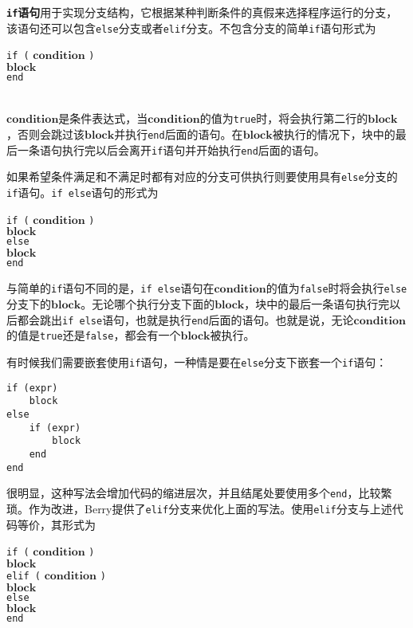 \textbf{\texttt{if}语句}用于实现分支结构，它根据某种判断条件的真假来选择程序运行的分支，该语句还可以包含\texttt{else}分支或者\texttt{elif}分支。不包含分支的简单\texttt{if}语句形式为
\begin{algorithm}
    \texttt{if (} $\bm{condition}$ \texttt{)} \\
    \qquad $\bm{block}$ \\
    \texttt{end}
\end{algorithm}\vspace{-0.6em}\\
$\bm{condition}$是条件表达式，当$\bm{condition}$的值为\texttt{true}时，将会执行第二行的$\bm{block}$，否则会跳过该$\bm{block}$并执行\texttt{end}后面的语句。在$\bm{block}$被执行的情况下，块中的最后一条语句执行完以后会离开\texttt{if}语句并开始执行\texttt{end}后面的语句。

如果希望条件满足和不满足时都有对应的分支可供执行则要使用具有\texttt{else}分支的\texttt{if}语句。\texttt{if else}语句的形式为
\begin{algorithm}
    \texttt{if (} $\bm{condition}$ \texttt{)} \\
        \qquad $\bm{block}$ \\
    \texttt{else} \\
        \qquad $\bm{block}$ \\
    \texttt{end}
\end{algorithm}\vspace{-0.6em}

与简单的\texttt{if}语句不同的是，\texttt{if else}语句在$\bm{condition}$的值为\texttt{false}时将会执行\texttt{else}分支下的$\bm{block}$。无论哪个执行分支下面的$\bm{block}$，块中的最后一条语句执行完以后都会跳出\texttt{if else}语句，也就是执行\texttt{end}后面的语句。也就是说，无论$\bm{condition}$的值是\texttt{true}还是\texttt{false}，都会有一个$\bm{block}$被执行。

有时候我们需要嵌套使用\texttt{if}语句，一种情是要在\texttt{else}分支下嵌套一个\texttt{if}语句：
\begin{lstlisting}[language=berry, numbers=none]
if (expr)
    block
else
    if (expr)
        block
    end
end
\end{lstlisting}
很明显，这种写法会增加代码的缩进层次，并且结尾处要使用多个\texttt{end}，比较繁琐。作为改进，Berry提供了\texttt{elif}分支来优化上面的写法。使用\texttt{elif}分支与上述代码等价，其形式为
\begin{algorithm}
    \texttt{if (} $\bm{condition}$ \texttt{)} \\
        \qquad $\bm{block}$ \\
    \texttt{elif (} $\bm{condition}$ \texttt{)} \\
        \qquad $\bm{block}$ \\
    \texttt{else} \\
    \qquad $\bm{block}$ \\
    \texttt{end}
\end{algorithm}\vspace{-0.6em}

